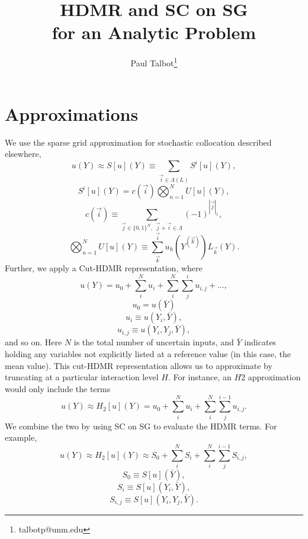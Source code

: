 \documentclass[11pt]{article}
\begin{document}
\title{HDMR and SC on SG \\for an Analytic Problem}

\author[]{Paul Talbot\thanks{talbotp@unm.edu}}
\renewcommand\Authands{ and }
\maketitle
\newpage
\section{Approximations}
We use the sparse grid approximation for stochastic collocation described elsewhere,
\begin{equation}
u(Y)\approx S[u](Y)\equiv \sum_{\vec i\in\Lambda(L)} S^i[u](Y),
\end{equation}
\begin{equation}
 S^i[u](Y) = c(\vec i)\bigotimes_{n=1}^N U[u](Y),
\end{equation}
\begin{equation}
c(\vec i)\equiv \sum_{\vec j\in\{0,1\}^N,\hspace{5pt}\vec j+\vec i \in \Lambda} (-1)^{|\vec j|_1},
\end{equation}
\begin{equation}
\bigotimes_{n=1}^N U[u](Y)\equiv \sum_{\vec k}^{\vec i} u_h(Y^{(\vec k)}) L_{\vec k}(Y).
\end{equation}
Further, we apply a Cut-HDMR representation, where
\begin{equation}
u(Y)= u_0 + \sum_i^N u_i + \sum_i^N\sum_j^i u_{i,j}+...,
\end{equation}
\begin{equation}
u_0=u(\bar Y)
\end{equation}
\begin{equation}
u_i\equiv u(Y_i,\bar Y),
\end{equation}
\begin{equation}
u_{i,j}\equiv u(Y_i,Y_j,\bar Y),
\end{equation}
and so on.  Here $N$ is the total number of uncertain inputs, and $\bar Y$ indicates holding any variables not explicitly listed at a reference value (in this case, the mean value).  This cut-HDMR representation allows us to approximate by truncating at a particular interaction level $H$.  For instance, an $H2$ approximation would only include the terms
\begin{equation}
u(Y)\approx H_2[u](Y) = u_0 + \sum_i^N u_i + \sum_i^N\sum_j^{i-1} u_{i,j}.
\end{equation}
We combine the two by using SC on SG to evaluate the HDMR terms.  For example,
\begin{equation}
u(Y)\approx H_2[u](Y)\approx S_0 + \sum_i^N S_i + \sum_i^N\sum_j^{i-1} S_{i,j},
\end{equation}
\begin{equation}
S_0\equiv S[u](\bar Y),
\end{equation}
\begin{equation}
S_i\equiv S[u](Y_i,\bar Y),
\end{equation}
\begin{equation}
S_{i,j}\equiv S[u](Y_i,Y_j,\bar Y).
\end{equation}
\end{document}
